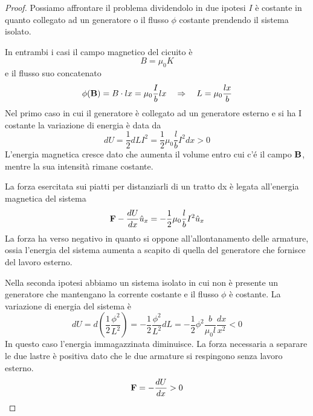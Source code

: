 \begin{proof}
	Possiamo affrontare il problema dividendolo in due ipotesi $I  $ \`e costante in quanto collegato ad un generatore o il flusso $\phi$ costante prendendo il sistema isolato.
	
In entrambi i casi il campo magnetico del cicuito \`e 
	\begin{equation*}
		B = \mu_0 K
	\end{equation*}
	e il flusso suo concatenato  
	\begin{equation*}
		\phi( \bold{B}) = B \cdot lx = \mu_0 \frac{I}{b}lx \quad \Rightarrow \quad L = \mu_0 \frac{lx}{b}
	\end{equation*}
Nel primo caso in cui il generatore \`e collegato ad un generatore esterno e si ha I costante la variazione di energia \`e data da 
\begin{equation*}
	dU = \frac{1}{2}dL I^2 = \frac{1}{2} \mu_0 \frac{l}{b}I^2 dx > 0
\end{equation*}
L'energia magnetica cresce dato che aumenta il volume entro cui c'\'e il campo $\bold{B}$, mentre la sua intensit\`a rimane costante.
\newline

La forza esercitata sui piatti per distanziarli di un tratto dx \`e legata all'energia magnetica del sistema 
\begin{equation*}
	\bold{F} - \frac{dU}{dx} \hat{u}_x = - \frac{1}{2}\mu_0 \frac{l}{b}I^2\hat{u}_x
\end{equation*}
La forza ha verso negativo in quanto si oppone all'allontanamento delle armature, ossia l'energia del sistema aumenta a scapito di quella del generatore che fornisce del lavoro esterno.
\newline

Nella seconda ipotesi abbiamo un sistema isolato in cui non \`e presente un generatore che mantengano la corrente costante e il flusso $\phi$ \`e costante. La variazione di energia del sistema \`e 
\begin{equation*}
	dU = d \left (\frac{1}{2} \frac{\phi^2}{L^2}\right) = - \frac{1}{2} \frac{\phi^2}{L^2}dL = - \frac{1}{2} \phi^2 \frac{b}{\mu_0 l} \frac{dx}{x^2} < 0
\end{equation*}
In questo caso l'energia immagazzinata diminuisce. La forza necessaria a separare le due lastre \`e positiva dato che le due armature si respingono senza lavoro esterno.
\begin{equation*}
	\bold{F} = -\frac{dU}{dx}>0
\end{equation*}

\end{proof}  

